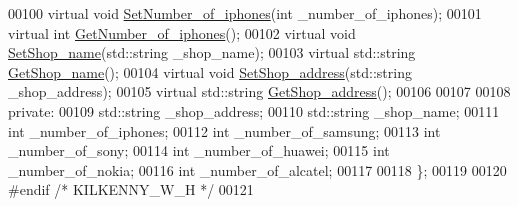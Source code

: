 \begin{DoxyCode}
00100     \textcolor{keyword}{virtual} \textcolor{keywordtype}{void} \hyperlink{class_k_i_l_k_e_n_n_y___w_abdea4a1698ad841e4d758e6b3e3bef62}{SetNumber\_of\_iphones}(\textcolor{keywordtype}{int} \_number\_of\_iphones);
00101     \textcolor{keyword}{virtual} \textcolor{keywordtype}{int} \hyperlink{class_k_i_l_k_e_n_n_y___w_aa8eb9ca20372744a05ab64def268a940}{GetNumber\_of\_iphones}();
00102     \textcolor{keyword}{virtual} \textcolor{keywordtype}{void} \hyperlink{class_k_i_l_k_e_n_n_y___w_a8670e50802ffeb6a8b4c148c4f5183aa}{SetShop\_name}(std::string \_shop\_name);
00103     \textcolor{keyword}{virtual} std::string \hyperlink{class_k_i_l_k_e_n_n_y___w_a93dac05f03edc97797f89501aa2af73a}{GetShop\_name}();
00104     \textcolor{keyword}{virtual} \textcolor{keywordtype}{void} \hyperlink{class_k_i_l_k_e_n_n_y___w_ac4ec867027aed72ff28bfe667da084cd}{SetShop\_address}(std::string \_shop\_address);
00105     \textcolor{keyword}{virtual} std::string \hyperlink{class_k_i_l_k_e_n_n_y___w_ad35a9d60fff2a3c1088f93ff04e6d9d4}{GetShop\_address}();
00106     
00107     
00108 \textcolor{keyword}{private}:
00109     std::string \_shop\_address;
00110     std::string \_shop\_name;
00111     \textcolor{keywordtype}{int} \_number\_of\_iphones;
00112     \textcolor{keywordtype}{int} \_number\_of\_samsung;
00113     \textcolor{keywordtype}{int} \_number\_of\_sony;
00114     \textcolor{keywordtype}{int} \_number\_of\_huawei;
00115     \textcolor{keywordtype}{int} \_number\_of\_nokia;
00116     \textcolor{keywordtype}{int} \_number\_of\_alcatel;
00117 
00118 \};
00119 
00120 \textcolor{preprocessor}{#endif }\textcolor{comment}{/* KILKENNY\_W\_H */}\textcolor{preprocessor}{}
00121 
\end{DoxyCode}

